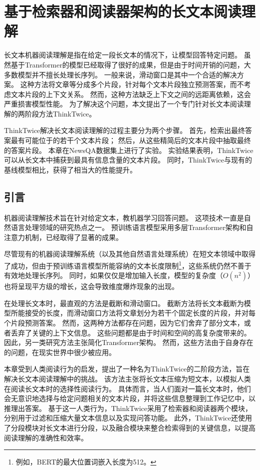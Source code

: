 \chapter{基于检索器和阅读器架构的长文本阅读理解}
长文本机器阅读理解是指在给定一段长文本的情况下，让模型回答特定问题。
虽然基于Transformer的模型已经取得了很好的成果，但是由于时间开销的问题，大多数模型并不擅长处理长序列。
一般来说，滑动窗口是其中一个合适的解决方案。
这种方法将文章等分成多个片段，针对每个文本片段独立预测答案，而不考虑文本片段的上下文关系。
然而，这种方法缺乏上下文之间的远距离依赖，这会严重损害模型性能。
为了解决这个问题，本文提出了一个专门针对长文本阅读理解的两阶段方法ThinkTwice。

ThinkTwice解决长文本阅读理解的过程主要分为两个步骤。
首先，检索出最终答案最有可能位于的若干个文本片段；
然后，从这些精简后的文本片段中抽取最终的答案片段。
本章在NewsQA数据集上进行了实验。
实验结果表明，ThinkTwice可以从长文本中捕获到最具有信息含量的文本片段。
同时，ThinkTwice与现有的基线模型相比，获得了相当大的性能提升。

\section{引言}
机器阅读理解技术\cite{hermann2015teaching}旨在针对给定文本，教机器学习回答问题。
这项技术一直是自然语言处理领域的研究热点之一。
预训练语言模型采用多层Transformer架构和自注意力机制\cite{vaswani2017attention}，已经取得了显著的成果。

尽管现有的机器阅读理解系统（以及其他自然语言处理系统）在短文本领域中取得了成功，但由于预训练语言模型所能容纳的文本长度限制\footnote{例如，BERT的最大位置词嵌入长度为512。}，这些系统仍然不善于有效地处理长序列。
同时，如果仅仅是增加输入长度，模型的复杂度（$O(n^2)$）也将呈现平方级的增长，这会导致维度爆炸现象的出现。

在处理长文本时，最直观的方法是截断\cite{rajpurkar2016squad,xie2019unsupervised}和滑动窗口\cite{joshi2019bert}。
截断方法将长文本截断为模型所能接受的长度，而滑动窗口方法将文章划分为若干个固定长度的片段，并对每个片段预测答案。
然而，这两种方法都存在问题，因为它们舍弃了部分文本，或者丢弃了关键的上下文信息。
这些问题都是由于时间和空间的高复杂度带来的。
因此，另一类研究方法主张简化Transformer架构\cite{beltagy2020longformer,zaheer2020big,ding2020ernie}。
然而，这些方法由于自身存在的问题，在现实世界中很少被应用。

本章受到人类阅读行为的启发，提出了一种名为ThinkTwice的二阶段方法，旨在解决长文本阅读理解中的挑战。
该方法主张将长文本压缩为短文本，以模拟人类在阅读长文本时的选择性阅读行为。
具体而言，当人们面对一篇长文本时，他们会无意识地选择与给定问题相关的文本片段，并将这些信息整理到工作记忆\cite{atkinson1968human}中，以推理出答案。
基于这一人类行为，ThinkTwice采用了检索器和阅读器两个模块，分别用于过滤和压缩大量文本信息以及实现问答功能。
此外，ThinkTwice还使用了分段模块对长文本进行分段，以及融合模块来整合检索得到的关键信息，以提高阅读理解的准确性和效率。

